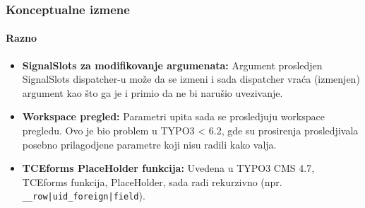 \begin{frame}[fragile]
	\frametitle{Konceptualne izmene}
	\framesubtitle{Razno}

	\begin{itemize}

		\item \textbf{SignalSlots za modifikovanje argumenata:}\newline
			\small
				Argument prosledjen SignalSlots dispatcher-u može da se izmeni i sada dispatcher vraća (izmenjen) argument kao što ga je i primio da ne bi narušio uvezivanje.
			\normalsize

		\item \textbf{Workspace pregled:}\newline
			\small
				Parametri upita sada se prosledjuju workspace pregledu. Ovo je bio problem u TYPO3 < 6.2, gde su prosirenja prosledjivala posebno prilagodjene parametre koji nisu radili kako valja.
			\normalsize

		\item \textbf{TCEforms PlaceHolder funkcija:}\newline
			\small
				Uvedena u TYPO3 CMS 4.7, TCEforms funkcija, PlaceHolder, sada radi rekurzivno (npr. \texttt{\_\_row|uid\_foreign|field}).
			\normalsize

	\end{itemize}
	
\end{frame}


